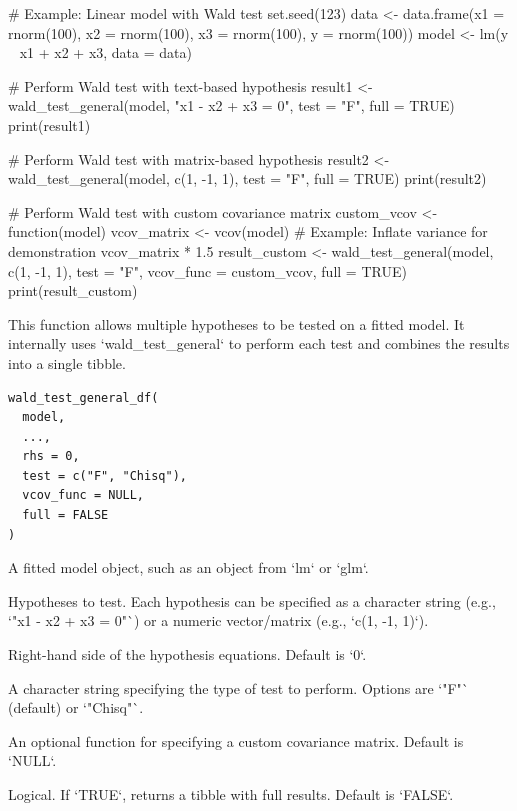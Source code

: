 \documentclass[a4paper]{book}
\begin{document}
%
\begin{Examples}
\begin{ExampleCode}
# Example: Linear model with Wald test
set.seed(123)
data <- data.frame(x1 = rnorm(100), x2 = rnorm(100), x3 = rnorm(100), y = rnorm(100))
model <- lm(y ~ x1 + x2 + x3, data = data)

# Perform Wald test with text-based hypothesis
result1 <- wald_test_general(model, "x1 - x2 + x3 = 0", test = "F", full = TRUE)
print(result1)

# Perform Wald test with matrix-based hypothesis
result2 <- wald_test_general(model, c(1, -1, 1), test = "F", full = TRUE)
print(result2)

# Perform Wald test with custom covariance matrix
custom_vcov <- function(model) {
  vcov_matrix <- vcov(model)
  # Example: Inflate variance for demonstration
  vcov_matrix * 1.5
}
result_custom <- wald_test_general(model, c(1, -1, 1), test = "F", vcov_func = custom_vcov, full = TRUE)
print(result_custom)

\end{ExampleCode}
\end{Examples}
%
\begin{Description}
This function allows multiple hypotheses to be tested on a fitted model. It internally
uses `wald\_test\_general` to perform each test and combines the results into a single
tibble.
\end{Description}
%
\begin{Usage}
\begin{verbatim}
wald_test_general_df(
  model,
  ...,
  rhs = 0,
  test = c("F", "Chisq"),
  vcov_func = NULL,
  full = FALSE
)
\end{verbatim}
\end{Usage}
%
\begin{Arguments}
\begin{ldescription}
\item[\code{model}] A fitted model object, such as an object from `lm` or `glm`.

\item[\code{...}] Hypotheses to test. Each hypothesis can be specified as a character string
(e.g., `"x1 - x2 + x3 = 0"`) or a numeric vector/matrix (e.g., `c(1, -1, 1)`).

\item[\code{rhs}] Right-hand side of the hypothesis equations. Default is `0`.

\item[\code{test}] A character string specifying the type of test to perform. Options are `"F"`
(default) or `"Chisq"`.

\item[\code{vcov\_func}] An optional function for specifying a custom covariance matrix. Default is `NULL`.

\item[\code{full}] Logical. If `TRUE`, returns a tibble with full results. Default is `FALSE`.
\end{ldescription}
\end{Arguments}
\end{document}
